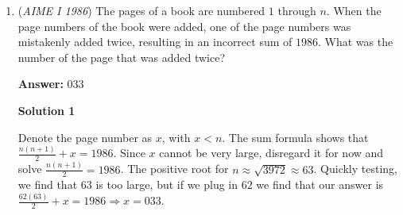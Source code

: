 \begin{enumerate}
 



\textbf{Solution 4}

The key to this problem is to realize that $n+10 \mid n^3 +1000$ for all $n$. Since we are asked to find the maximum possible $n$ such that $n+10 \mid n^3 +100$, we have: $n+10 \mid ((n^3 +1000) - (n^3 +100) \longrightarrow n+10 \mid 900$. This is because of the property that states that if $a \mid b$ and $a \mid c$, then $a \mid b \pm c$. Since, the largest factor of 900 is itself we have: $n+10=900 \Longrightarrow \boxed{n = 890}$




\textbf{Solution 5 (Easy Modular Arithmetic)}

Notice that $n\equiv -10 \pmod{n+10}$. Therefore 
 \[0 \equiv n^3+100\equiv(-10)^3+100=-900 \pmod{n+10} \Rightarrow n+10 | 900 \Rightarrow \max_{n+10 | n^3+100} {n} = \boxed{890}.\]




\textbf{Solution 6 (Easiest Factor)}

In the problem, we can see that $n^3 + 100$ has a cube. Immediately think of sum of cubes, which leads us to add 900, resulting in $(n^3 + 10^3) - 900$ --> $(n+10)(n^2 - 10n + 100) - 900$. Since the $(n+10)(n^2 - 10n + 100)$ contains $(n+10)$, this part is divisible by $n+10$ --> therefore the 900 must be divisible by $n+10$. The largest $n$ that satisfies this is $900-10 = \boxed{890}$.

 


	\item (\textit{AIME I 1986}) The pages of a book are numbered $1$ through $n$. When the page numbers of the book were added, one of the page numbers was mistakenly added twice, resulting in an incorrect sum of $1986$. What was the number of the page that was added twice?


 
 \textbf{Answer: }033



\textbf{Solution 1}

Denote the page number as $x$, with $x < n$. The sum formula shows that $\frac{n(n + 1)}{2} + x = 1986$. Since $x$ cannot be very large, disregard it for now and solve $\frac{n(n+1)}{2} = 1986$. The positive root for $n \approx \sqrt{3972} \approx 63$. Quickly testing, we find that $63$ is too large, but if we plug in $62$ we find that our answer is $\frac{62(63)}{2} + x = 1986 \Longrightarrow x = \boxed{033}$.

 




\end{enumerate}
